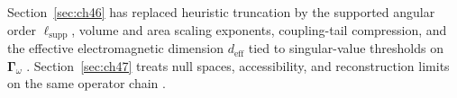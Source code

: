 Section~\ref{sec:ch46} has replaced heuristic truncation by the supported angular order \(\ell_{\mathrm{supp}}\), volume and area scaling
exponents, coupling-tail compression, and the effective electromagnetic dimension \(d_{\mathrm{eff}}\) tied to singular-value thresholds on
\(\boldsymbol{\Gamma}_\omega\) \cite{stratton1941,hansen1988,harrington2001,jackson1999,devaney2004}. Section~\ref{sec:ch47} treats null
spaces, accessibility, and reconstruction limits on the same operator chain \cite{devaney2004,collin2001}.
